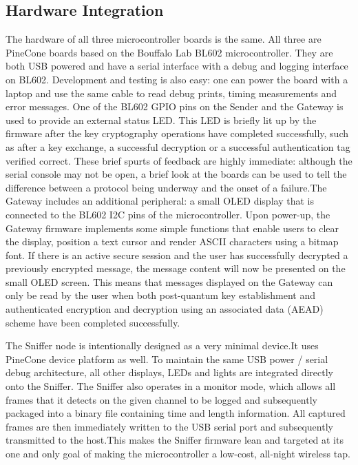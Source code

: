 \documentclass[a4paper]{scrartcl}
\begin{document}
    \subsection{Hardware Integration}
    The hardware of all three microcontroller boards is the same. All three are PineCone boards based on the Bouffalo Lab BL602 microcontroller. They are both USB powered and have a serial interface with a debug and logging interface on BL602. Development and testing is also easy: one can power the board with a laptop and use the same cable to read debug prints, timing measurements and error messages. One of the BL602 GPIO pins on the Sender and the Gateway is used to provide an external status LED. This LED is briefly lit up by the firmware after the key cryptography operations have completed successfully, such as after a key exchange, a successful decryption or a successful authentication tag verified correct. These brief spurts of feedback are highly immediate: although the serial console may not be open, a brief look at the boards can be used to tell the difference between a protocol being underway and the onset of a failure.The Gateway includes an additional peripheral: a small OLED display that is connected to the BL602 I2C pins of the microcontroller. Upon power-up, the Gateway firmware implements some simple functions that enable users to clear the display, position a text cursor and render ASCII characters using a bitmap font. If there is an active secure session and the user has successfully decrypted a previously encrypted message, the message content will now be presented on the small OLED screen. This means that messages displayed on the Gateway can only be read by the user when both post-quantum key establishment and authenticated encryption and decryption using an associated data (AEAD) scheme have been completed successfully.

    The Sniffer node is intentionally designed as a very minimal device.It uses PineCone device platform as well. To maintain the same USB power / serial debug architecture, all other displays, LEDs and lights are integrated directly onto the Sniffer. The Sniffer also operates in a monitor mode, which allows all frames that it detects on the given channel to be logged and subsequently packaged into a binary file containing time and length information. All captured frames are then immediately written to the USB serial port and subsequently transmitted to the host.This makes the Sniffer firmware lean and targeted at its one and only goal of making the microcontroller a low-cost, all-night wireless tap.
\end{document}
